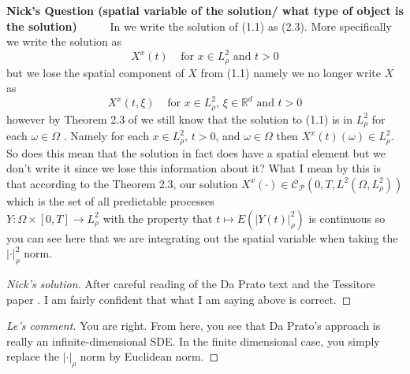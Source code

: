 \documentclass[a4paper,11pt]{article}
\theoremstyle{plain}
\theoremstyle{definition}
\newcounter{NQ}
\newenvironment{NickQuestion}[1][] %
  {\refstepcounter{NQ}
  \begin{mdframed}[backgroundcolor=lightgray]\textbf{Nick's Question \theNQ \: #1~~}~~~\noindent}%
  {\end{mdframed}}
\numberwithin{NQ}{section}
\numberwithin{LQ}{section}
\numberwithin{ZQ}{section}
\begin{document}
\begin{NickQuestion}[(spatial variable of the solution/ what type of object is the solution)]
In \cite{TessitoreZabczyk98M} we write the solution of (1.1) as (2.3). More specifically we write the 
solution as $$ X^x(t) \;\;\;\; \text{for $x\in L^2_\rho$ and $t>0$}$$ but we lose the spatial component of $X$ from (1.1) namely we no longer write $X$ as $$ X^x(t,\xi) \;\;\;\; \text{for $x\in L^2_\rho$, $\xi \in \mathbb R^d$ and $t>0$} $$ however by Theorem 2.3 of \cite{TessitoreZabczyk98M} we still know that the solution to (1.1) is in $L^2_\rho$ for each $\omega \in \Omega$ . Namely for each $x \in L^2_\rho$, $t>0$, and $\omega \in \Omega$ then $X^x(t)(\omega) \in L^2_\rho$. So does this mean that the solution in fact does have a spatial element but we don't write it since we lose this information about it? What I mean by this is that according to the Theorem 2.3, our solution $X^x(\cdot) \in \mathscr C_{\mathscr P}(0,T,L^2(\Omega,L^2_\rho))$ which is the set of all predictable processes \\ $Y:\Omega \times [0,T] \to L^2_\rho$ with the property that $t\mapsto E(|Y(t)|^2_\rho)$ is continuous so you can see here that we are integrating out the spatial variable when taking the $|\cdot|^2_\rho$ norm. 
\end{NickQuestion}

\begin{proof}[Nick's solution]
After careful reading of the Da Prato text \cite{DZ96} and the Tessitore paper \cite{TessitoreZabczyk98M}. I am fairly confident that what I am saying above is correct. 
\end{proof}

\begin{proof}[Le's comment]
You are right. From here, you see that Da Prato's approach is really an infinite-dimensional SDE. In the finite dimensional case, you simply replace the $|\cdot|_\rho$ norm by Euclidean norm.
\end{proof}
\end{document}
